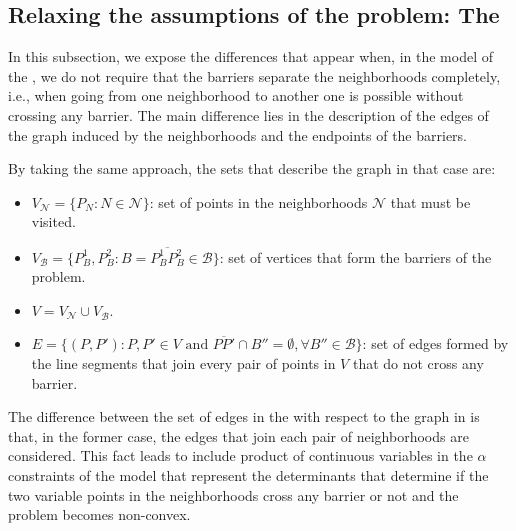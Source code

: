 \documentclass[a4paper]{elsarticle}
\newcommand{\TSPN}{{\sf{H-TSPN}\xspace }}
\newcommand{\TSPVN}{{\sf{H-TSPVN}\xspace }}
\newcommand{\B}{{\mathcal B}}
\newcommand{\VB}{{V^{}_{\mathcal B}}}
\newcommand{\VN}{{V^{}_{\mathcal N}}}
\newcommand{\CV}[1]{{\color{atomictangerine}#1}}
\begin{document}
	
	\CV{
		\subsection{Relaxing the assumptions of the problem: The \TSPVN}
		
		In this subsection, we expose the differences that appear when, in the model of the \TSPN, we do not require that the barriers separate the neighborhoods completely, i.e., when going from one neighborhood to another one is possible without crossing any barrier. The main difference lies in the description of the edges of the graph induced by the neighborhoods and the endpoints of the barriers.
		
		By taking the same approach, the sets that describe the graph in that case are:
		
		\begin{itemize}
			\item $\VN=\{P_N:N\in\mathcal N\}$: set of points in the neighborhoods $\mathcal N$ that must be visited.
			\item $\VB=\{P^1_B, P^2_B:B=\overline{P^1_B P^2_B}\in \mathcal B\}$: set of vertices that form the barriers of the problem.
			\item $V = \VN \cup \VB$.
			\item $E=\{(P, P'):P, P' \in V \text{ and } \overline{PP'}\cap B''=\emptyset,\forall B''\in\B\}$: set of edges formed by the line segments that join every pair of points in $V$ that do not cross any barrier.
		\end{itemize} 
		
		The difference between the set of edges in the \TSPVN with respect to the graph in \TSPN is that, in the former case, the edges that join each pair of neighborhoods are considered. This fact leads to include product of continuous variables in the $\alpha$ constraints of the model that represent the determinants that determine if the two variable points in the neighborhoods cross any barrier or not and the problem becomes non-convex.
		
	}
	
	
\end{document}

